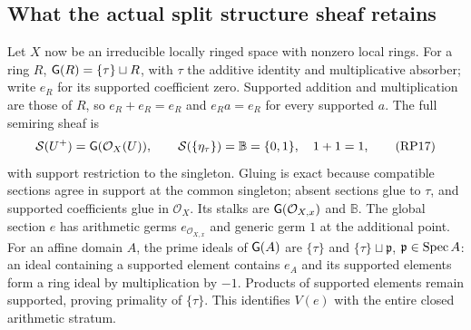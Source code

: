 \subsection{What the actual split structure sheaf retains}
\label{sec:actual-semiring}

Let $X$ now be an irreducible locally ringed space with nonzero local
rings. For a ring $R$, $\mathsf G(R)=\{\tau\}\sqcup R$, with $\tau$ the
additive identity and multiplicative absorber; write $e_R$ for its
supported coefficient zero. Supported addition and multiplication
are those of $R$, so $e_R+e_R=e_R$ and $e_Ra=e_R$ for every supported
$a$. The full semiring sheaf is
\[
 \mathcal S(U^+)=\mathsf G(\mathcal O_X(U)),\qquad
 \mathcal S(\{\eta_\tau\})=\mathbb B=\{0,1\},\quad1+1=1,
 \tag{RP17}\label{eq:semiring-sheaf}
\]
with support restriction to the singleton. Gluing is exact because
compatible sections agree in support at the common singleton; absent
sections glue to $\tau$, and supported coefficients glue in
$\mathcal O_X$. Its stalks are $\mathsf G(\mathcal O_{X,x})$ and $\mathbb B$.
The global section $e$ has arithmetic germs $e_{\mathcal O_{X,x}}$
and generic germ $1$ at the additional point. For an affine domain
$A$, the prime ideals of $\mathsf G(A)$ are $\{\tau\}$ and
$\{\tau\}\sqcup\mathfrak p$, $\mathfrak p\in\operatorname{Spec} A$: an ideal
containing a supported element contains $e_A$ and its supported
elements form a ring ideal by multiplication by $-1$. Products of
supported elements remain supported, proving primality of $\{\tau\}$.
This identifies $V(e)$ with the entire closed arithmetic stratum.

